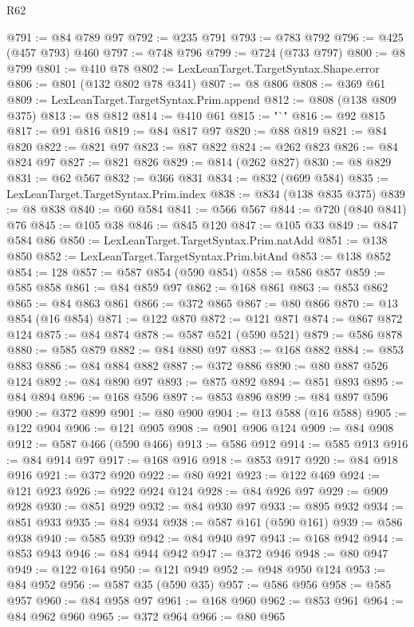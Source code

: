 \begin{lexlean}{R62}
\begin{coremodule}
@791 := @84 @789 @97
@792 := @235 @791
@793 := @783 @792
@796 := @425 (@457 @793) @460
@797 := @748 @796
@799 := @724 (@733 @797)
@800 := @8 @799
@801 := @410 @78
@802 := LexLeanTarget.TargetSyntax.Shape.error
@806 := @801 (@132 @802 @78 @341)
@807 := @8 @806
@808 := @369 @61
@809 := LexLeanTarget.TargetSyntax.Prim.append
@812 := @808 (@138 @809 @375)
@813 := @8 @812
@814 := @410 @61
@815 := "`"
@816 := @92 @815
@817 := @91 @816
@819 := @84 @817 @97
@820 := @88 @819
@821 := @84 @820
@822 := @821 @97
@823 := @87 @822
@824 := @262 @823
@826 := @84 @824 @97
@827 := @821 @826
@829 := @814 (@262 @827)
@830 := @8 @829
@831 := @62 @567
@832 := @366 @831
@834 := @832 (@699 @584)
@835 := LexLeanTarget.TargetSyntax.Prim.index
@838 := @834 (@138 @835 @375)
@839 := @8 @838
@840 := @60 @584
@841 := @566 @567
@844 := @720 (@840 @841) @76
@845 := @105 @38
@846 := @845 @120
@847 := @105 @33
@849 := @847 @584 @86
@850 := LexLeanTarget.TargetSyntax.Prim.natAdd
@851 := @138 @850
@852 := LexLeanTarget.TargetSyntax.Prim.bitAnd
@853 := @138 @852
@854 := 128
@857 := @587 @854 (@590 @854)
@858 := @586 @857
@859 := @585 @858
@861 := @84 @859 @97
@862 := @168 @861
@863 := @853 @862
@865 := @84 @863 @861
@866 := @372 @865
@867 := @80 @866
@870 := @13 @854 (@16 @854)
@871 := @122 @870
@872 := @121 @871
@874 := @867 @872 @124
@875 := @84 @874
@878 := @587 @521 (@590 @521)
@879 := @586 @878
@880 := @585 @879
@882 := @84 @880 @97
@883 := @168 @882
@884 := @853 @883
@886 := @84 @884 @882
@887 := @372 @886
@890 := @80 @887 @526 @124
@892 := @84 @890 @97
@893 := @875 @892
@894 := @851 @893
@895 := @84 @894
@896 := @168 @596
@897 := @853 @896
@899 := @84 @897 @596
@900 := @372 @899
@901 := @80 @900
@904 := @13 @588 (@16 @588)
@905 := @122 @904
@906 := @121 @905
@908 := @901 @906 @124
@909 := @84 @908
@912 := @587 @466 (@590 @466)
@913 := @586 @912
@914 := @585 @913
@916 := @84 @914 @97
@917 := @168 @916
@918 := @853 @917
@920 := @84 @918 @916
@921 := @372 @920
@922 := @80 @921
@923 := @122 @469
@924 := @121 @923
@926 := @922 @924 @124
@928 := @84 @926 @97
@929 := @909 @928
@930 := @851 @929
@932 := @84 @930 @97
@933 := @895 @932
@934 := @851 @933
@935 := @84 @934
@938 := @587 @161 (@590 @161)
@939 := @586 @938
@940 := @585 @939
@942 := @84 @940 @97
@943 := @168 @942
@944 := @853 @943
@946 := @84 @944 @942
@947 := @372 @946
@948 := @80 @947
@949 := @122 @164
@950 := @121 @949
@952 := @948 @950 @124
@953 := @84 @952
@956 := @587 @35 (@590 @35)
@957 := @586 @956
@958 := @585 @957
@960 := @84 @958 @97
@961 := @168 @960
@962 := @853 @961
@964 := @84 @962 @960
@965 := @372 @964
@966 := @80 @965

\end{coremodule}
\end{lexlean}

